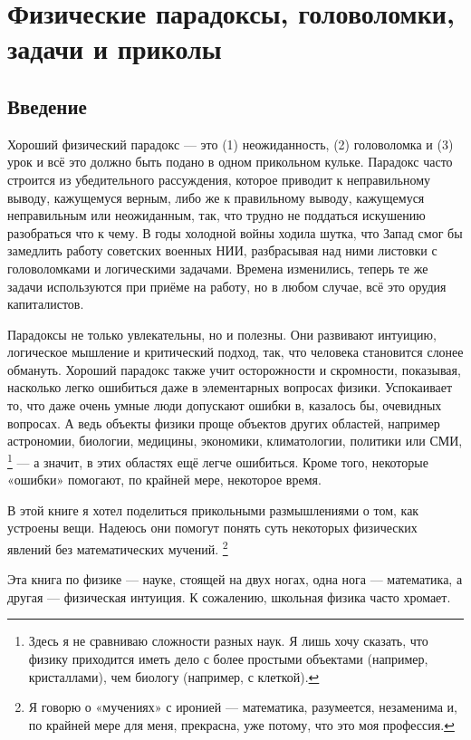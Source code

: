 \chapter[Парадоксы, головоломки, задачи]{Физические парадоксы, головоломки, задачи и приколы}

\section{Введение}

Хороший физический парадокс --- это (1) неожиданность, (2) головоломка и (3) урок и всё это должно быть подано в одном прикольном кульке.
Парадокс часто строится из убедительного рассуждения, которое приводит к неправильному выводу, кажущемуся верным, либо же к правильному выводу, кажущемуся неправильным или неожиданным,
так, что трудно не поддаться искушению разобраться что к чему.
В годы холодной войны ходила шутка, что Запад смог бы замедлить работу советских военных НИИ, разбрасывая над ними листовки с головоломками и логическими задачами.
Времена изменились, теперь те же задачи используются при приёме на работу, но в любом случае, всё это орудия капиталистов.

Парадоксы не только увлекательны, но и полезны.
Они развивают интуицию, логическое мышление и критический подход, так, что
человека становится слонее обмануть.
Хороший парадокс также учит осторожности и скромности, показывая, насколько легко ошибиться даже в элементарных вопросах физики.
Успокаивает то, что даже очень умные люди допускают ошибки в, казалось бы, очевидных вопросах.
А ведь объекты физики проще объектов других областей, например астрономии, биологии, медицины, экономики, климатологии, политики или СМИ,%
\footnote{Здесь я не сравниваю сложности разных наук.
Я лишь хочу сказать, что физику приходится иметь дело с более простыми объектами (например, кристаллами), чем биологу (например, с клеткой).} — а значит, в этих областях ещё легче ошибиться.
Кроме того, некоторые «ошибки» помогают, по крайней мере, некоторое время.

В этой книге я хотел поделиться прикольными размышлениями о том, как устроены вещи.
Надеюсь они помогут понять суть некоторых физических явлений без математических мучений.%
\footnote{Я говорю о «мучениях» с иронией — математика, разумеется, незаменима и, по крайней мере для меня, прекрасна, уже потому, что это моя профессия.}

Эта книга по физике — науке, стоящей на двух ногах, одна нога --- математика, а другая --- физическая интуиция.
К сожалению, школьная физика часто хромает.

